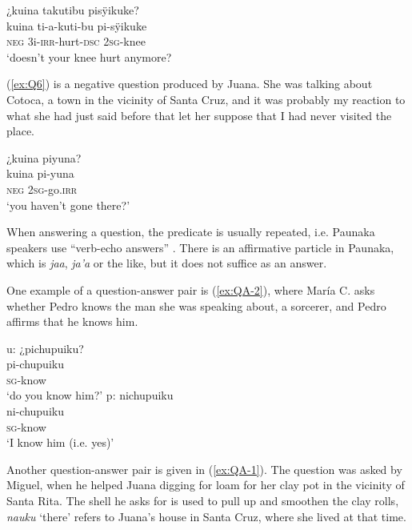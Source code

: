 \ea\label{ex:Q5}
\begingl
\glpreamble ¿kuina takutibu pisÿikuke?\\
\gla kuina ti-a-kuti-bu pi-sÿikuke\\
\glb \textsc{neg} 3i-\textsc{irr}-hurt-\textsc{dsc} 2\textsc{sg}-knee\\
\glft ‘doesn’t your knee hurt anymore?
\endgl
\trailingcitation{[rxx-e181022le]}
\xe

(\ref{ex:Q6}) is a negative question produced by Juana. She was talking about Cotoca, a town in the vicinity of Santa Cruz, and it was probably my reaction to what she had just said before that let her suppose that I had never visited the place.

\ea\label{ex:Q6}
\begingl
\glpreamble ¿kuina piyuna?\\
\gla kuina pi-yuna\\
\glb \textsc{neg} 2\textsc{sg}-go.\textsc{irr}\\
\glft ‘you haven’t gone there?’
\endgl
\trailingcitation{[jxx-p120430l-2.551]}
\xe

When answering a question, the predicate is usually repeated, i.e. Paunaka speakers use “verb-echo answers” \citep[3]{Holmberg2016}. There is an affirmative particle in Paunaka, which is \textit{jaa}, \textit{ja’a} or the like, but it does not suffice as an answer. 

One example of a question-answer pair is (\ref{ex:QA-2}), where María C. asks whether Pedro knows the man she was speaking about, a sorcerer, and Pedro affirms that he knows him.


\ea\label{ex:QA-2}
  \ea\label{ex:QA-2.1}
\begingl
\glpreamble \textup{u:} ¿pichupuiku?\\
\gla pi-chupuiku\\
\textsc{sg}-know\\
\glft ‘do you know him?’
\endgl
  \ex\label{ex:QA-2.2}
\begingl
\glpreamble \textup{p:} nichupuiku\\
\gla ni-chupuiku\\
\textsc{sg}-know\\
\glft ‘I know him (i.e. yes)’
\endgl
\trailingcitation{[ump-p110815sf.553-554]}
\z
\xe


Another question-answer pair is given in (\ref{ex:QA-1}). The question was asked by Miguel, when he helped Juana digging for loam for her clay pot in the vicinity of Santa Rita. The shell he asks for is used to pull up and smoothen the clay rolls, \textit{nauku} ‘there’ refers to Juana’s house in Santa Cruz, where she lived at that time.

